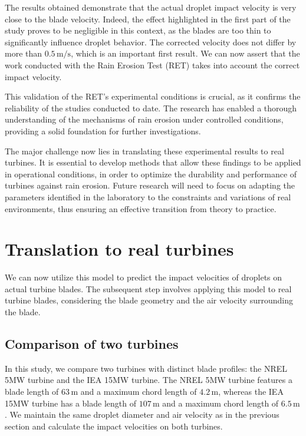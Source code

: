 \documentclass[10pt]{report}
\begin{document}
\par The results obtained demonstrate that the actual droplet impact velocity is very close to the blade velocity. Indeed, the effect highlighted in the first part of the study proves to be negligible in this context, as the blades are too thin to significantly influence droplet behavior. The corrected velocity does not differ by more than \(0.5 \, \text{m/s}\), which is an important first result. We can now assert that the work conducted with the Rain Erosion Test (RET) takes into account the correct impact velocity.
\par This validation of the RET's experimental conditions is crucial, as it confirms the reliability of the studies conducted to date. The research has enabled a thorough understanding of the mechanisms of rain erosion under controlled conditions, providing a solid foundation for further investigations.
\par The major challenge now lies in translating these experimental results to real turbines. It is essential to develop methods that allow these findings to be applied in operational conditions, in order to optimize the durability and performance of turbines against rain erosion. Future research will need to focus on adapting the parameters identified in the laboratory to the constraints and variations of real environments, thus ensuring an effective transition from theory to practice.



\section*{Translation to real turbines}

We can now utilize this model to predict the impact velocities of droplets on actual turbine blades. The subsequent step involves applying this model to real turbine blades, considering the blade geometry and the air velocity surrounding the blade.

\subsection*{Comparison of two turbines}

In this study, we compare two turbines with distinct blade profiles: the NREL 5MW turbine and the IEA 15MW turbine. The NREL 5MW turbine features a blade length of \(63 \, \text{m}\) and a maximum chord length of \(4.2 \, \text{m}\), whereas the IEA 15MW turbine has a blade length of \(107 \, \text{m}\) and a maximum chord length of \(6.5 \, \text{m}\). We maintain the same droplet diameter and air velocity as in the previous section and calculate the impact velocities on both turbines.
\end{document}
